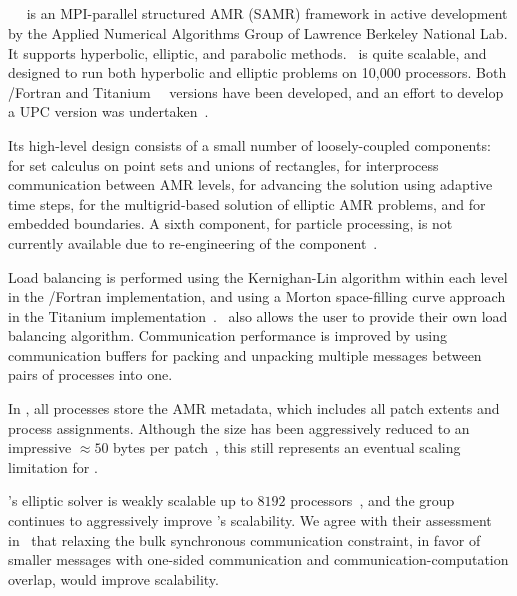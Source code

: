 \documentclass[10pt,twocolumn]{article}
\begin{document}
\subsection{\chombo} \label{ss:chombo}

\chombo~\cite{wwwchombo}~\cite{CoGr09} is an MPI-parallel structured
AMR (SAMR) framework in active development by the Applied Numerical
Algorithms Group of Lawrence Berkeley National Lab.  It supports
hyperbolic, elliptic, and parabolic methods.  \chombo\ is quite
scalable, and designed to run both hyperbolic and elliptic problems
on 10,000 processors.  Both \cpp/Fortran and
Titanium~\cite{wwwtitanium}~\cite{YeSe98} versions have been
developed, and an effort to develop a UPC version was
undertaken~\cite{We04}.

Its high-level design consists of a small number of loosely-coupled
components:  for set calculus on point sets and unions
of rectangles,  for interprocess communication between
AMR levels,  for advancing the solution using
adaptive time steps,  for the multigrid-based
solution of elliptic AMR problems, and  for embedded
boundaries.  A sixth component,  for particle
processing, is not currently available due to re-engineering of the
component~\cite{wwwchombo}.

Load balancing is performed using the Kernighan-Lin algorithm within
each level in the \cpp/Fortran implementation, and using a Morton
space-filling curve approach in the Titanium
implementation~\cite{WeSu07}.  \chombo\ also allows the user to
provide their own load balancing algorithm.  Communication performance
is improved by using communication buffers for packing and unpacking
multiple messages between pairs of processes into one.

In \chombo, all processes store the AMR metadata, which includes all
patch extents and process assignments.  Although the size has been
aggressively reduced to an impressive $\approx 50$ bytes per
patch~\cite{CoBe07}, this still represents an eventual scaling
limitation for \chombo.

\chombo's elliptic solver is weakly scalable up to $8192$
processors~\cite{WeSu07}, and the group continues to aggressively
improve \chombo's scalability.  We agree with their assessment
in~\cite{WeSu07} that relaxing the bulk synchronous communication
constraint, in favor of smaller messages with one-sided communication
and communication-computation overlap, would improve scalability.
\end{document}
